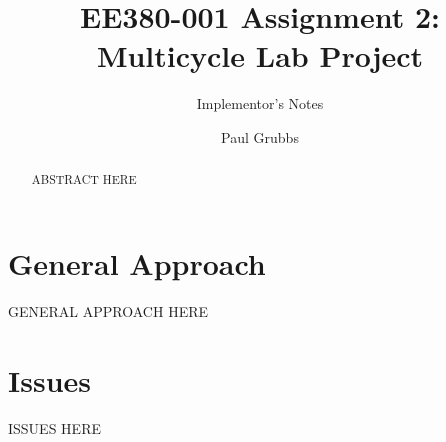 \documentclass[acmtog]{acmart}
\begin{document}

\title{EE380-001 Assignment 2: Multicycle Lab Project}
\subtitle{Implementor's Notes}

\author{Paul Grubbs}
\author{}
\author{}

\begin{abstract}
ABSTRACT HERE
\end{abstract}

\maketitle

\section{General Approach}
GENERAL APPROACH HERE
\section{Issues}
ISSUES HERE
\end{document}
